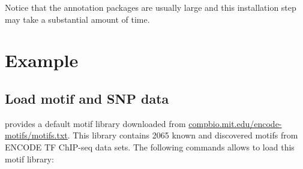 \documentclass[a4paper,10pt]{article}\usepackage[]{graphicx}\usepackage[]{color}
\begin{document}



Notice that the annotation packages are usually large and this installation step may take a substantial amount of time.



\section{Example}

\subsection{Load motif and SNP data}

 provides a default motif library downloaded from \url{compbio.mit.edu/encode-motifs/motifs.txt}. This library contains 2065 known and discovered motifs from ENCODE TF ChIP-seq data sets. The following commands allows to load this motif library:



\end{document}
